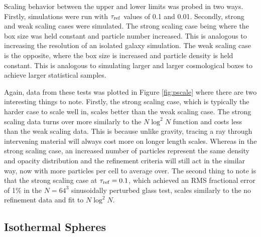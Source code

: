\documentclass[fleq,usenatbib]{mnras}
\newcommand{\tr}{\tau_{\rm ref}}
\begin{document}
Scaling behavior between the upper and lower limits was probed in two ways. 
Firstly, simulations were run with $\tr$ values of 0.1 and 0.01. Secondly, 
strong and weak scaling cases were simulated. The strong scaling case being 
where the box size was held constant and particle number increased. This is 
analogous to increasing the resolution of an isolated galaxy simulation. The 
weak scaling case is the opposite, where the box size is increased and 
particle density is held constant. This is analogous to simulating larger and 
larger cosmological boxes to achieve larger statistical samples. 

Again, data from these tests was plotted in Figure \ref{fig:pscale} where 
there are two interesting things to note. Firstly, the strong scaling case, 
which is typically the harder case to scale well in, scales better than the 
weak scaling case. The strong scaling data turns over more similarly to the
$N\log^2{N}$ function and costs less than the weak scaling data. This is 
because unlike gravity, tracing a ray through intervening material will always 
cost more on longer length scales. Whereas in the strong scaling case, an 
increased number of particles represent the same density and opacity 
distribution and the refinement criteria will still act in the similar way, 
now with more particles per cell to average over. The second thing to note is 
that the strong scaling case at $\tr=0.1$, which achieved an RMS fractional 
error of 1\% in the $N=64^3$ sinusoidally perturbed glass test, scales 
similarly to the no refinement data and fit to $N\log^2{N}$. 

\subsection{Isothermal Spheres}
\end{document}
